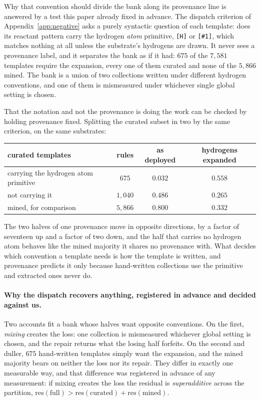 Why that convention should divide the bank along its provenance line is answered by a test this
paper already fixed in advance. The dispatch criterion of Appendix~\ref{app:negative} asks a purely
syntactic question of each template: does its reactant pattern carry the hydrogen \emph{atom}
primitive, \texttt{[H]} or \texttt{[\#1]}, which matches nothing at all unless the substrate's
hydrogens are drawn. It never sees a provenance label, and it separates the bank as if it had:
$675$ of the $7{,}581$ templates require the expansion, every one of them curated and none of the
$5{,}866$ mined. The bank is a union of two collections written under different hydrogen
conventions, and one of them is mismeasured under whichever single global setting is chosen.

That the notation and not the provenance is doing the work can be checked by holding provenance
fixed. Splitting the curated subset in two by the same criterion, on the same substrates:

\begin{center}
\begin{tabular}{lccc}
\toprule
curated templates & rules & as deployed & hydrogens expanded \\
\midrule
carrying the hydrogen atom primitive & $675$   & $0.032$ & $0.558$ \\
not carrying it                      & $1{,}040$ & $0.486$ & $0.265$ \\
\midrule
mined, for comparison                & $5{,}866$ & $0.800$ & $0.332$ \\
\bottomrule
\end{tabular}
\end{center}

The two halves of one provenance move in opposite directions, by a factor of seventeen up and a
factor of two down, and the half that carries no hydrogen atom behaves like the mined majority it shares no
provenance with. What decides which convention a template needs is how the template is written, and
provenance predicts it only because hand-written collections use the primitive and extracted ones
never do.

\paragraph{Why the dispatch recovers anything, registered in advance and decided against us.} Two
accounts fit a bank whose halves want opposite conventions. On the first, \emph{mixing} creates the
loss: one collection is mismeasured whichever global setting is chosen, and the repair returns what
the losing half forfeits. On the second and duller, $675$ hand-written templates simply want the
expansion, and the mined majority bears on neither the loss nor its repair. They differ in exactly
one measurable way, and that difference was registered in advance of any measurement: if mixing creates the
loss the residual is \emph{superadditive} across the partition, $\mathrm{res}(\text{full}) >
\mathrm{res}(\text{curated}) + \mathrm{res}(\text{mined})$.

